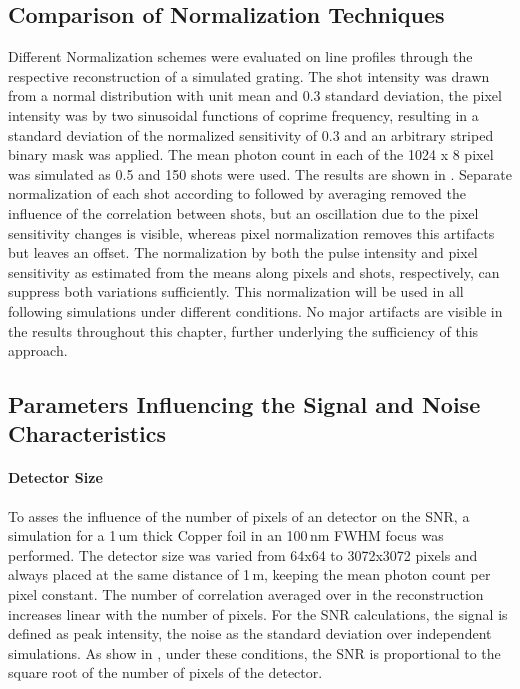 \subsection{Comparison of Normalization Techniques}
Different Normalization schemes were evaluated on line profiles through the respective reconstruction of a simulated grating. The shot intensity was drawn from a normal distribution with unit mean and 0.3 standard deviation, the pixel intensity was by two sinusoidal functions of coprime frequency, resulting in a standard deviation of the normalized sensitivity of 0.3 and an arbitrary striped binary mask was applied. The mean photon count in each of the 1024 x 8 pixel was simulated as 0.5 and 150 shots were used. The results are shown in .
Separate normalization of each shot according to   followed by averaging removed the influence of the correlation between shots, but an oscillation due to the pixel sensitivity changes is visible, whereas pixel normalization removes this artifacts but leaves an offset. The normalization by both the pulse intensity and pixel sensitivity as estimated from the means along pixels and shots, respectively, can suppress both variations sufficiently. This normalization will be used in all following simulations under different conditions. No major artifacts are visible in the results throughout this chapter, further underlying the sufficiency of this approach.

\subsection{Parameters Influencing the Signal and Noise Characteristics}
\paragraph{Detector Size}
	
	To asses the influence of the number of pixels of an detector on the SNR, a simulation for a 1\,um thick Copper foil in an 100\,nm FWHM focus was performed. The detector size was varied from 64x64 to 3072x3072 pixels and always placed at the same distance of 1\,m, keeping the mean photon count per pixel constant. The number of correlation averaged over in the reconstruction increases linear with the number of pixels. For the SNR calculations, the signal is defined as peak intensity, the noise as the standard deviation over independent simulations.  As show in , under these conditions, the SNR is proportional to the square root of the number of pixels of the detector. 




